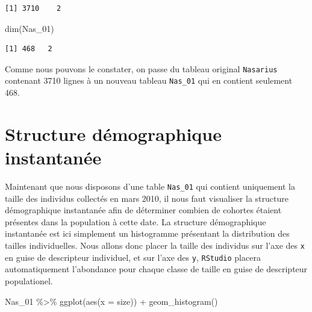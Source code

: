 \documentclass[
  a4paper,
  DIV=11,
  numbers=noendperiod,
  oneside]{scrreprt}
\newenvironment{Shaded}{}{}
\newcommand{\AttributeTok}[1]{\textcolor[rgb]{0.84,0.23,0.29}{#1}}
\newcommand{\FunctionTok}[1]{\textcolor[rgb]{0.44,0.26,0.76}{#1}}
\newcommand{\NormalTok}[1]{\textcolor[rgb]{0.14,0.16,0.18}{#1}}
\newcommand{\SpecialCharTok}[1]{\textcolor[rgb]{0.00,0.36,0.77}{#1}}
\begin{document}
\begin{verbatim}
[1] 3710    2
\end{verbatim}

\begin{Shaded}
\begin{Highlighting}[]
\FunctionTok{dim}\NormalTok{(Nas\_01)}
\end{Highlighting}
\end{Shaded}

\begin{verbatim}
[1] 468   2
\end{verbatim}


Comme nous pouvons le constater, on passe du tableau original
\texttt{Nasarius} contenant 3710 lignes à un nouveau tableau
\texttt{Nas\_01} qui en contient seulement 468.

\hypertarget{structure-duxe9mographique-instantanuxe9e}{%
\section{Structure démographique
instantanée}\label{structure-duxe9mographique-instantanuxe9e}}

Maintenant que nous disposons d'une table \texttt{Nas\_01} qui contient
uniquement la taille des individus collectés en mars 2010, il nous faut
visualiser la structure démographique instantanée afin de déterminer
combien de cohortes étaient présentes dans la population à cette date.
La structure démographique instantanée est ici simplement un histogramme
présentant la distribution des tailles individuelles. Nous allons donc
placer la taille des individus sur l'axe des \texttt{x} en guise de
descripteur individuel, et sur l'axe des \texttt{y}, \texttt{RStudio}
placera automatiquement l'abondance pour chaque classe de taille en
guise de descripteur populationel.

\begin{Shaded}
\begin{Highlighting}[]
\NormalTok{Nas\_01 }\SpecialCharTok{\%\textgreater{}\%}
  \FunctionTok{ggplot}\NormalTok{(}\FunctionTok{aes}\NormalTok{(}\AttributeTok{x =}\NormalTok{ size)) }\SpecialCharTok{+}
  \FunctionTok{geom\_histogram}\NormalTok{()}
\end{Highlighting}
\end{Shaded}
\end{document}
